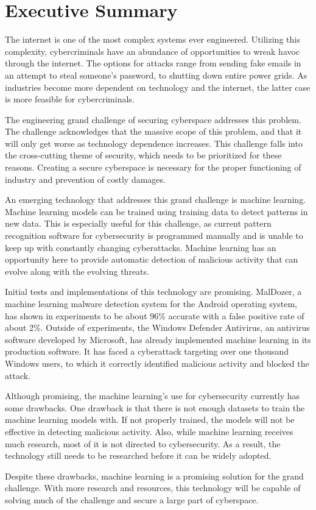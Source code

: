 
\section*{Executive Summary}
\setcounter{page}{2}
The internet is one of the most complex systems ever engineered.
Utilizing this complexity, cybercriminals have an abundance of opportunities to wreak havoc through the internet.
The options for attacks range from sending fake emails in an attempt to steal someone's password, to shutting down entire power grids.
As industries become more dependent on technology and the internet, the latter case is more feasible for cybercriminals.

The engineering grand challenge of securing cyberspace addresses this problem.
The challenge acknowledges that the massive scope of this problem, and that it will only get worse as technology dependence increases.
This challenge falls into the cross-cutting theme of security, which needs to be prioritized for these reasons.
Creating a secure cyberspace is necessary for the proper functioning of industry and prevention of costly damages.

An emerging technology that addresses this grand challenge is machine learning.
Machine learning models can be trained using training data to detect patterns in new data.
This is especially useful for this challenge, as current pattern recognition software for cybersecurity is programmed manually and is unable to keep up with constantly changing cyberattacks.
Machine learning has an opportunity here to provide automatic detection of malicious activity that can evolve along with the evolving threats.

Initial tests and implementations of this technology are promising.
MalDozer, a machine learning malware detection system for the Android operating system, has shown in experiments to be about 96\% accurate with a false positive rate of about 2\%.
Outside of experiments, the Windows Defender Antivirus, an antivirus software developed by Microsoft, has already implemented machine learning in its production software.
It has faced a cyberattack targeting over one thousand Windows users, to which it correctly identified malicious activity and blocked the attack.

Although promising, the machine learning's use for cybersecurity currently has some drawbacks.
One drawback is that there is not enough datasets to train the machine learning models with.
If not properly trained, the models will not be effective in detecting malicious activity.
Also, while machine learning receives much research, most of it is not directed to cybersecurity.
As a result, the technology still needs to be researched before it can be widely adopted.

Despite these drawbacks, machine learning is a promising solution for the grand challenge.
With more research and resources, this technology will be capable of solving much of the challenge and secure a large part of cyberspace.
